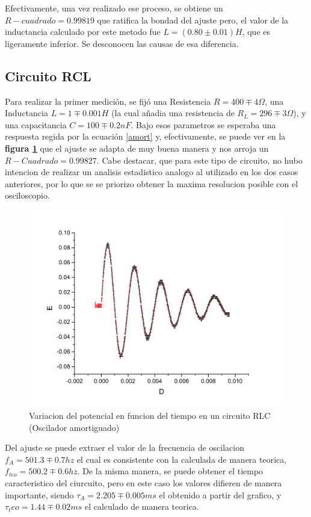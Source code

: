 \documentclass[11pt,a4paper]{article}
\begin{document}
Efectivamente, una vez realizado ese proceso, se obtiene un $R-cuadrado = 0.99819$ que ratifica la bondad del ajuste pero, el valor de la inductancia calculado por este metodo fue $L = (0.80 \pm 0.01) H$, que es ligeramente inferior. Se desconocen las causas de esa diferencia.


\subsection{Circuito RCL}

Para realizar la primer medición, se fijó una Resistencia $R= 400 \mp 4 \Omega$, una Inductancia $L = 1 \mp 0.001 H$ (la cual añadia una resistencia de $R_{L} = 296 \mp 3 \Omega$), y una capacitancia $C = 100 \mp 0.2 nF$. Bajo esos parametros se esperaba una respuesta regida por la ecuación \eqref{amort} y, efectivamente, se puede ver en la \textbf{figura \ref{fig:RLC-A}} que el ajuste se adapta de muy buena manera y nos arroja un $R-Cuadrado = 0.99827$. Cabe destacar, que para este tipo de circuito, no hubo intencion de realizar un analisis estadistico analogo al utilizado en los dos casos anteriores, por lo que se se priorizo obtener la maxima resolucion posible con el osciloscopio.

\begin{figure}[H]
\centering
\includegraphics[scale=0.45]{RLC-Amortiguado(1H)}
  \caption{Variacion del potencial en funcion del tiempo en un circuito RLC (Oscilador amortiguado)}
  \label{fig:RLC-A}
\end{figure}

 Del ajuste se puede extraer el valor de la frecuencia de oscilacion $f_{A} = 501.3 \mp 0.7 hz$ el cual es consistente con la calculada de manera teorica, $f_{teo} = 500.2 \mp 0.6 hz$. De la misma manera, se puede obtener el tiempo caracteristico del ciurcuito, pero en este caso los valores difieren de manera importante, siendo $\tau_A = 2.205 \mp 0.005 ms$ el obtenido a partir del grafico, y $\tau_teo = 1.44 \mp 0.02 ms$ el calculado de manera teorica.
\end{document}
